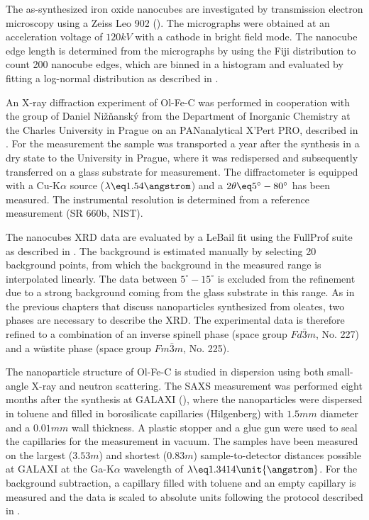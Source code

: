 \documentclass[\main/dresen_thesis.tex]{subfiles}
\begin{document}
    The as-synthesized iron oxide nanocubes are investigated by transmission electron microscopy using a Zeiss Leo 902 ().
    The micrographs were obtained at an acceleration voltage of $120 \unit{kV}$ with a  cathode in bright field mode.
    The nanocube edge length is determined from the micrographs by using the Fiji distribution \cite{Schindelin_2012_Fijia} to count 200 nanocube edges, which are binned in a histogram and evaluated by fitting a log-normal distribution as described in .

    An X-ray diffraction experiment of Ol-Fe-C was performed in cooperation with the group of Daniel Nižňanský from the Department of Inorganic Chemistry at the Charles University in Prague on an PANanalytical X'Pert PRO, described in .
    For the measurement the sample was transported a year after the synthesis in a dry state to the University in Prague, where it was redispersed and subsequently transferred on a glass substrate for measurement.
    The diffractometer is equipped with a Cu-K$\alpha$ source ($\lambda \eq 1.54 \angstrom$) and a $2 \theta \eq 5^\circ - 80^\circ$ has been measured.
    The instrumental resolution is determined from a  reference measurement (SR 660b, NIST).

    The nanocubes XRD data are evaluated by a LeBail fit using the FullProf suite \cite{Rodriguez_1993_Recen} as described in .
    The background is estimated manually by selecting 20 background points, from which the background in the measured range is interpolated linearly.
    The data between $5 ^\circ - 15 ^\circ$ is excluded from the refinement due to a strong background coming from the glass substrate in this range.
    As in the previous chapters that discuss nanoparticles synthesized from oleates, two phases are necessary to describe the XRD.
    The experimental data is therefore refined to a combination of an inverse spinell phase (space group $Fd\bar{3}m$, No. 227) and a w\"ustite phase (space group $Fm\bar{3}m$, No. 225).

    The nanoparticle structure of Ol-Fe-C is studied in dispersion using both small-angle X-ray and neutron scattering.
    The SAXS measurement was performed eight months after the synthesis at GALAXI (), where the nanoparticles were dispersed in toluene and filled in borosilicate capillaries (Hilgenberg) with $1.5 \unit{mm}$ diameter and a $0.01 \unit{mm}$ wall thickness.
    A plastic stopper and a glue gun were used to seal the capillaries for the measurement in vacuum.
    The samples have been measured on the largest ($3.53 \unit{m}$) and shortest ($0.83 \unit{m}$) sample-to-detector distances possible at GALAXI at the Ga-K$\alpha$ wavelength of $\lambda \eq 1.3414 \unit{\angstrom}$.
    For the background subtraction, a capillary filled with toluene and an empty capillary is measured and the data is scaled to absolute units following the protocol described in .
\end{document}
